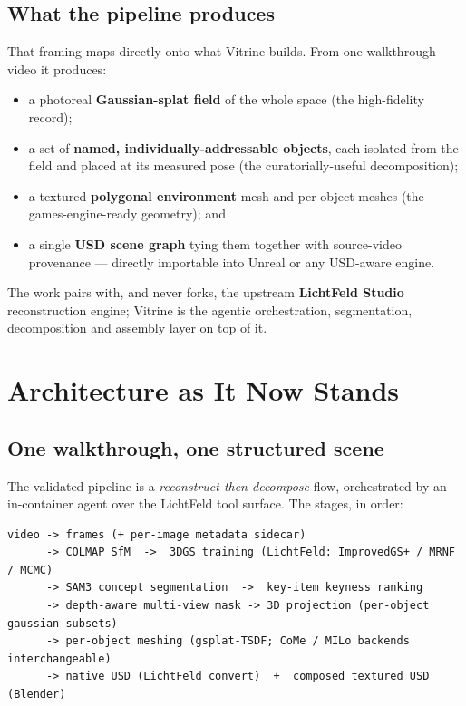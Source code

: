 \documentclass[a4paper,11pt]{report}
\begin{document}
\section{What the pipeline produces}
That framing maps directly onto what Vitrine builds. From one walkthrough video it produces:
\begin{itemize}
  \item a photoreal \textbf{Gaussian-splat field} of the whole space (the high-fidelity record);
  \item a set of \textbf{named, individually-addressable objects}, each isolated from the field and placed
        at its measured pose (the curatorially-useful decomposition);
  \item a textured \textbf{polygonal environment} mesh and per-object meshes (the games-engine-ready
        geometry); and
  \item a single \textbf{USD scene graph} tying them together with source-video provenance — directly
        importable into Unreal or any USD-aware engine.
\end{itemize}
The work pairs with, and never forks, the upstream \textbf{LichtFeld Studio} reconstruction engine; Vitrine
is the agentic orchestration, segmentation, decomposition and assembly layer on top of it.

\chapter{Architecture as It Now Stands}

\section{One walkthrough, one structured scene}
The validated pipeline is a \emph{reconstruct-then-decompose} flow, orchestrated by an in-container agent
over the LichtFeld tool surface. The stages, in order:

\begin{lstlisting}
video -> frames (+ per-image metadata sidecar)
      -> COLMAP SfM  ->  3DGS training (LichtFeld: ImprovedGS+ / MRNF / MCMC)
      -> SAM3 concept segmentation  ->  key-item keyness ranking
      -> depth-aware multi-view mask -> 3D projection (per-object gaussian subsets)
      -> per-object meshing (gsplat-TSDF; CoMe / MILo backends interchangeable)
      -> native USD (LichtFeld convert)  +  composed textured USD (Blender)
\end{lstlisting}
\end{document}
